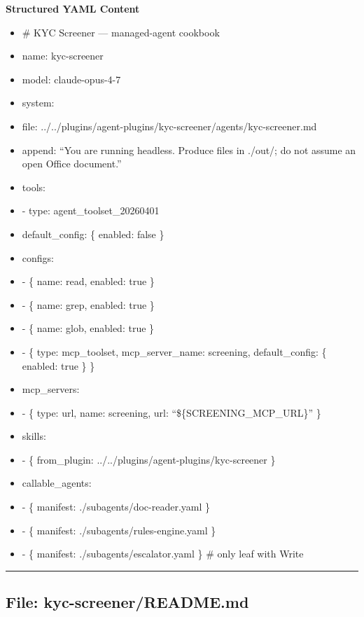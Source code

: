 \documentclass[11pt]{article}
\begin{document}
\textbf{Structured YAML Content}
\begin{itemize}[leftmargin=*,itemsep=2pt,topsep=2pt]
\item {} \# KYC Screener — managed-agent cookbook
\item {} name: kyc-screener
\item {} model: claude-opus-4-7
\item {} system:
\item {} file: ../../plugins/agent-plugins/kyc-screener/agents/kyc-screener.md
\item {} append: ``You are running headless. Produce files in ./out/; do not assume an open Office document.''
\item {} tools:
\item {} - type: agent\_\allowbreak{}toolset\_\allowbreak{}20260401
\item {} default\_\allowbreak{}config: \{ enabled: false \}
\item {} configs:
\item {} - \{ name: read, enabled: true \}
\item {} - \{ name: grep, enabled: true \}
\item {} - \{ name: glob, enabled: true \}
\item {} - \{ type: mcp\_\allowbreak{}toolset, mcp\_\allowbreak{}server\_\allowbreak{}name: screening, default\_\allowbreak{}config: \{ enabled: true \} \}
\item {} mcp\_\allowbreak{}servers:
\item {} - \{ type: url, name: screening, url: ``\$\{SCREENING\_\allowbreak{}MCP\_\allowbreak{}URL\}'' \}
\item {} skills:
\item {} - \{ from\_\allowbreak{}plugin: ../../plugins/agent-plugins/kyc-screener \}
\item {} callable\_\allowbreak{}agents:
\item {} - \{ manifest: ./subagents/doc-reader.yaml \}
\item {} - \{ manifest: ./subagents/rules-engine.yaml \}
\item {} - \{ manifest: ./subagents/escalator.yaml \} \# only leaf with Write
\end{itemize}

\vspace{0.8em}\hrule\vspace{0.8em}

\subsection{File: kyc-screener/README.md}\label{file:kyc-screener-README-md}
\end{document}
